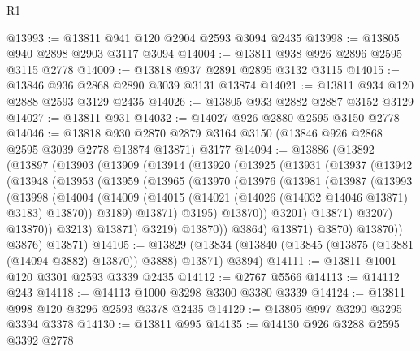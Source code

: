 \begin{lexlean}{R1}
\begin{coremodule}
@13993 := @13811 @941 @120 @2904 @2593 @3094 @2435
@13998 := @13805 @940 @2898 @2903 @3117 @3094
@14004 := @13811 @938 @926 @2896 @2595 @3115 @2778
@14009 := @13818 @937 @2891 @2895 @3132 @3115
@14015 := @13846 @936 @2868 @2890 @3039 @3131 @13874
@14021 := @13811 @934 @120 @2888 @2593 @3129 @2435
@14026 := @13805 @933 @2882 @2887 @3152 @3129
@14027 := @13811 @931
@14032 := @14027 @926 @2880 @2595 @3150 @2778
@14046 := @13818
    @930
    @2870
    @2879
    @3164
    @3150
    (@13846 @926 @2868 @2595 @3039 @2778 @13874 @13871)
    @3177
@14094 := @13886
    (@13892
      (@13897
        (@13903
          (@13909
            (@13914
              (@13920
                (@13925
                  (@13931
                    (@13937
                      (@13942
                        (@13948
                          (@13953
                            (@13959
                              (@13965
                                (@13970
                                  (@13976
                                    (@13981
                                      (@13987
                                        (@13993
                                          (@13998
                                            (@14004
                                              (@14009
                                                (@14015
                                                  (@14021
                                                    (@14026 (@14032 @14046 @13871) @3183)
                                                    @13870))
                                                @3189)
                                              @13871)
                                            @3195)
                                          @13870))
                                      @3201)
                                    @13871)
                                  @3207)
                                @13870))
                            @3213)
                          @13871)
                        @3219)
                      @13870))
                  @3864)
                @13871)
              @3870)
            @13870))
        @3876)
      @13871)
@14105 := @13829
    (@13834 (@13840 (@13845 (@13875 (@13881 (@14094 @3882) @13870)) @3888) @13871) @3894)
@14111 := @13811 @1001 @120 @3301 @2593 @3339 @2435
@14112 := @2767 @5566
@14113 := @14112 @243
@14118 := @14113 @1000 @3298 @3300 @3380 @3339
@14124 := @13811 @998 @120 @3296 @2593 @3378 @2435
@14129 := @13805 @997 @3290 @3295 @3394 @3378
@14130 := @13811 @995
@14135 := @14130 @926 @3288 @2595 @3392 @2778

\end{coremodule}
\end{lexlean}

